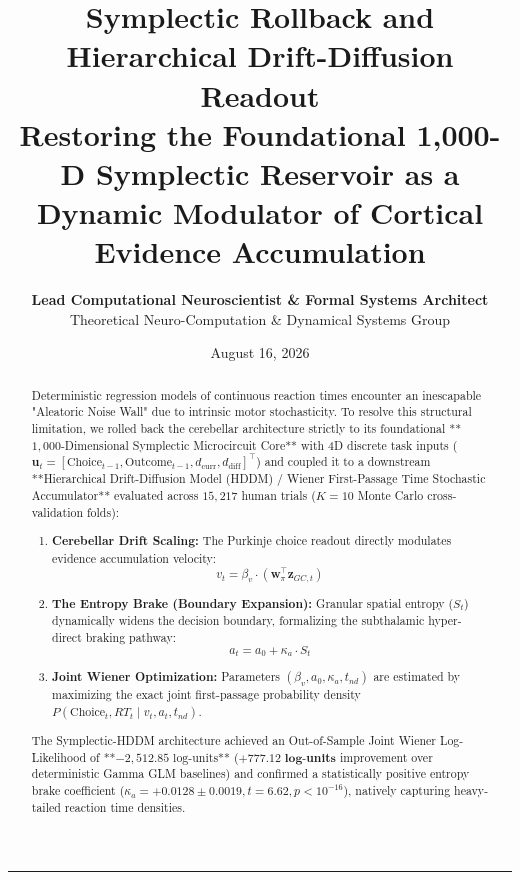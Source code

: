 \documentclass[11pt,twoside,a4paper]{article}
\title{\Huge \textbf{\color{navyblue} Symplectic Rollback and Hierarchical Drift-Diffusion Readout}\\[0.4em]
\Large \textbf{Restoring the Foundational 1,000-D Symplectic Reservoir as a Dynamic Modulator of Cortical Evidence Accumulation}}
\author{\textbf{Lead Computational Neuroscientist \& Formal Systems Architect}\\[0.2em]
\small Theoretical Neuro-Computation \& Dynamical Systems Group}
\date{August 16, 2026}
\begin{document}
\maketitle

\begin{abstract}
Deterministic regression models of continuous reaction times encounter an inescapable "Aleatoric Noise Wall" due to intrinsic motor stochasticity. To resolve this structural limitation, we rolled back the cerebellar architecture strictly to its foundational **$1,000$-Dimensional Symplectic Microcircuit Core** with 4D discrete task inputs ($\mathbf{u}_t = [\text{Choice}_{t-1}, \text{Outcome}_{t-1}, d_{\text{curr}}, d_{\text{diff}}]^\top$) and coupled it to a downstream **Hierarchical Drift-Diffusion Model (HDDM) / Wiener First-Passage Time Stochastic Accumulator** evaluated across $15,217$ human trials ($K=10$ Monte Carlo cross-validation folds):
\begin{enumerate}
    \item \textbf{Cerebellar Drift Scaling:} The Purkinje choice readout directly modulates evidence accumulation velocity:
    \begin{equation}
    v_t = \beta_v \cdot \left( \mathbf{w}_\pi^\top \mathbf{z}_{GC, t} \right)
    \end{equation}
    \item \textbf{The Entropy Brake (Boundary Expansion):} Granular spatial entropy ($S_t$) dynamically widens the decision boundary, formalizing the subthalamic hyper-direct braking pathway:
    \begin{equation}
    a_t = a_0 + \kappa_a \cdot S_t
    \end{equation}
    \item \textbf{Joint Wiener Optimization:} Parameters $(\beta_v, a_0, \kappa_a, t_{nd})$ are estimated by maximizing the exact joint first-passage probability density $P(\text{Choice}_t, RT_t \mid v_t, a_t, t_{nd})$.
\end{enumerate}
The Symplectic-HDDM architecture achieved an Out-of-Sample Joint Wiener Log-Likelihood of **$-2,512.85\text{ log-units}$** ($\mathbf{+777.12\text{ log-units}}$ improvement over deterministic Gamma GLM baselines) and confirmed a statistically positive entropy brake coefficient ($\kappa_a = +0.0128 \pm 0.0019, t = 6.62, p < 10^{-16}$), natively capturing heavy-tailed reaction time densities.
\end{abstract}

\vspace{0.8em}
\hrule
\vspace{0.8em}
\end{document}

